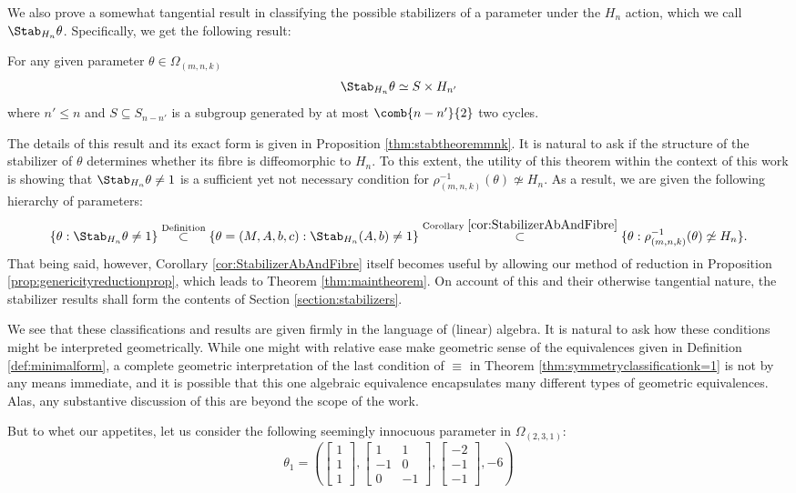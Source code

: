 \documentclass[11pt,letterpaper]{amsart}
\begin{document}
\par We also prove a somewhat tangential result in classifying the possible stabilizers of a parameter under the $H_n$ action, which we call $\Stab_{H_n}\theta$. Specifically, we get the following result:
\begin{theorem}\label{thm:mainstabtheorem}
    For any given parameter $\theta\in\Omega_{(m,n,k)}$
    $$
    \Stab_{H_n} \theta \simeq S \times H_{n'}
    $$
    where $n'\leq n$ and $S\subseteq S_{n-n'}$ is a subgroup generated by at most $\comb{n-n'}{2}$ two cycles.
\end{theorem}
The details of this result and its exact form is given in Proposition \ref{thm:stabtheoremmnk}. It is natural to ask if the structure of the stabilizer of $\theta$ determines whether its fibre is diffeomorphic to $H_n$. To this extent, the utility of this theorem within the context of this work is showing that $\Stab_{H_n}\theta\neq 1$ is a sufficient yet not necessary condition for $\rho_{(m,n,k)}^{-1}(\theta)\not\simeq H_n$. As a result, we are given the following hierarchy of parameters: 
$$
\{\theta : \Stab_{H_n}\theta\neq 1\} \stackrel{\textup{Definition}}{\subset} \{\theta = (M, A, b,c) : \Stab_{H_n}(A, b)\neq 1\} \stackrel{\textup{Corollary }\ref{cor:StabilizerAbAndFibre}}{\subset} \{\theta: \rho_{(m,n,k)}^{-1}(\theta)\not\simeq H_n\}.
$$
That being said, however, Corollary \ref{cor:StabilizerAbAndFibre} itself becomes useful by allowing our method of reduction in Proposition \ref{prop:genericityreductionprop}, which leads to Theorem \ref{thm:maintheorem}. On account of this and their otherwise tangential nature, the stabilizer results shall form the contents of Section \ref{section:stabilizers}. 
\par We see that these classifications and results are given firmly in the language of (linear) algebra. It is natural to ask how these conditions might be interpreted geometrically. While one might with relative ease make geometric sense of the equivalences given in Definition \ref{def:minimalform}, a complete geometric interpretation of the last condition of $\equiv$ in Theorem \ref{thm:symmetryclassificationk=1} is not by any means immediate, and it is possible that this one algebraic equivalence encapsulates many different types of geometric equivalences. Alas, any substantive discussion of this are beyond the scope of the work. 
\par But to whet our appetites, let us consider the following seemingly innocuous parameter in $\Omega_{(2,3,1)}$:
$$
\theta_1=\left(\begin{bmatrix}
    1\\1\\1
\end{bmatrix}, \begin{bmatrix}
    1 & 1\\
    -1 & 0 \\
    0 & -1
\end{bmatrix}, \begin{bmatrix}
    -2 \\ -1 \\ -1
\end{bmatrix},-6\right)
$$
\end{document}
